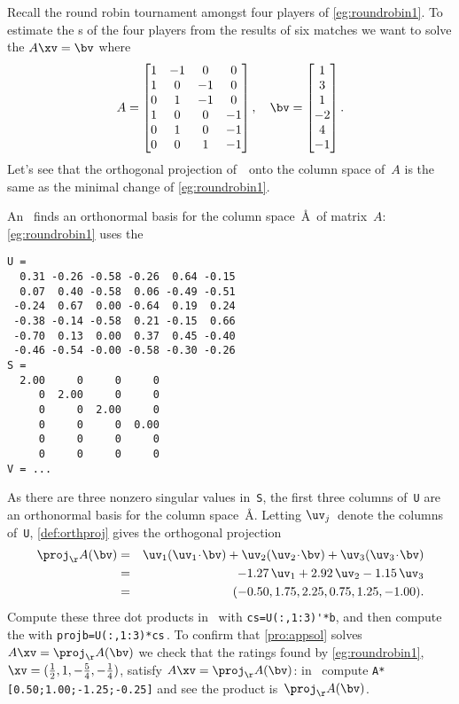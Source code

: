 \begin{example} \label{eg:roundrobin2}
Recall the round robin tournament amongst four players of \cref{eg:roundrobin1}.
To estimate the s of the four players from the results of six matches we want to solve the 
 \(A\xv=\bv\) where
\begin{equation*}
A=\begin{bmatrix}    1 & -1 & 0 & 0
\\ 1 & 0 & -1 & 0
\\ 0 & 1 & -1 & 0
\\ 1 & 0 & 0 & -1
\\ 0 & 1 & 0 & -1
\\ 0 & 0 & 1 & -1
 \end{bmatrix},\quad
 \bv=\begin{bmatrix} 1\\ 3\\ 1\\ -2\\ 4\\ -1 \end{bmatrix}.
\end{equation*}
Let's see that the orthogonal projection of~\bv\ onto the column space of~\(A\) is the same as the minimal change of \cref{eg:roundrobin1}.

An \svd\ finds an orthonormal basis for the column space~\AA\ of matrix~\(A\): \cref{eg:roundrobin1} uses the \svd\ \twodp
\setbox\ajrqrbox\hbox{}%
\marginajrbox%
\begin{verbatim}
U =
  0.31 -0.26 -0.58 -0.26  0.64 -0.15
  0.07  0.40 -0.58  0.06 -0.49 -0.51
 -0.24  0.67  0.00 -0.64  0.19  0.24
 -0.38 -0.14 -0.58  0.21 -0.15  0.66
 -0.70  0.13  0.00  0.37  0.45 -0.40
 -0.46 -0.54 -0.00 -0.58 -0.30 -0.26
S =
  2.00     0     0     0
     0  2.00     0     0
     0     0  2.00     0
     0     0     0  0.00
     0     0     0     0
     0     0     0     0
V = ...
\end{verbatim}
As there are three nonzero singular values in~\verb|S|, the first three columns of~\verb|U| are an orthonormal basis for the column space~\AA.
Letting \(\uv_j\)~denote the columns of~\verb|U|, \cref{def:orthproj} gives the orthogonal projection \twodp
\begin{eqnarray*}
\proj_\AA(\bv)
&=&\uv_1(\uv_1\cdot\bv)+\uv_2(\uv_2\cdot\bv)+\uv_3(\uv_3\cdot\bv)
\\&=&-1.27\,\uv_1+2.92\,\uv_2-1.15\,\uv_3
\\&=&(-0.50,1.75,2.25,0.75,1.25,-1.00).
\end{eqnarray*}
Compute these three dot products in \script\ with \verb|cs=U(:,1:3)'*b|, and then compute the  with \verb|projb=U(:,1:3)*cs|\,.
To confirm that \cref{pro:appsol} solves \(A\xv=\proj_\AA(\bv)\) we check that the ratings found by \cref{eg:roundrobin1}, \(\xv=(\frac12,1,-\frac54,-\frac14)\), satisfy \(A\xv=\proj_\AA(\bv)\): in \script\ compute \verb|A*[0.50;1.00;-1.25;-0.25]| and see the product is~\(\proj_\AA(\bv)\).
\end{example}


